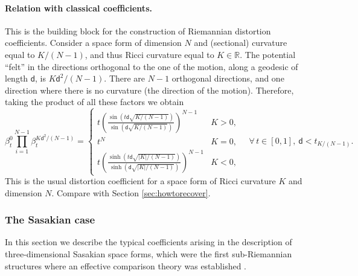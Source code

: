 \documentclass[11pt,a4paper]{article}
\theoremstyle{plain}
\theoremstyle{definition}
\theoremstyle{remark}
\numberwithin{equation}{section}
\newcommand{\R}{\mathbb{R}} %
\newcommand{\sfd}{\mathsf d}
\begin{document}
\paragraph{Relation with classical coefficients.} This is the building block for the 
construction of Riemannian distortion coefficients. Consider a space form of dimension 
$N$ and (sectional) curvature equal to $K/(N-1)$, and thus Ricci curvature equal to 
$K\in \R$. The potential ``felt'' in the directions orthogonal to the one of the motion, 
along a geodesic of length $\sfd$, is $K\sfd^2/(N-1)$. There are $N-1$ 
orthogonal directions, and one direction where there is no curvature (the direction of the 
motion). Therefore, taking the product of all these factors we obtain
\begin{equation}
\beta_t^0 \prod_{i=1}^{N-1} \beta_t^{K\sfd^2/(N-1)} =  \begin{cases}
t \left(\frac{\sin (t\sfd \sqrt{K/(N-1)})}{\sin (\sfd\sqrt{ K/(N-1)})}\right)^{N-1} & K>0,\\
t^N & K=0,\\
t \left(\frac{\sinh (t\sfd \sqrt{|K|/(N-1)})}{\sinh (\sfd\sqrt{ |K|/(N-1)})}\right)^{N-1} & K<0,
\end{cases}
\quad \forall\, t\in [0,1],\ \sfd < t_{K/(N-1)}.
\end{equation}
This is the usual distortion coefficient for a space form of Ricci curvature $K$ and dimension $N$. Compare with Section \ref{sec:howtorecover}.

\subsubsection{The Sasakian case}\label{ss:Sasakiancase}

In this section we describe the typical coefficients arising in the description of three-dimensional Sasakian space forms, which were the first sub-Riemannian structures where an effective comparison theory was established \cite{HughenPhD,AAPL-Ricci, LeeLiZel-Sasakian}.
\end{document}
